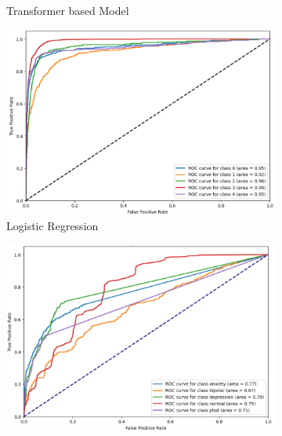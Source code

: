 \begin{figure}[H]
\begin{subfigure}[b]{0.49\textwidth}
        \caption*{Transformer based Model}
        \label{dfdl146}  %
    \end{subfigure}
    \label{fig:lstm_comparison}
    \caption*{ROC AUC for Models without Hyperparameter Tuning}
    \vspace{0.75cm}
    \begin{subfigure}[b]{0.49\textwidth}
        \centering
        \includegraphics[width=\textwidth]{Images/HP LR ROC.png}
        \caption*{Logistic Regression}
        \label{LSTMROC3}  %
    \end{subfigure}
    \hfill
    \vspace{0.5cm}
    \begin{subfigure}[b]{0.49\textwidth}
        \centering
        \includegraphics[width=\textwidth]{Images/HP KNN ROC.png}

\end{subfigure}
\end{figure}
